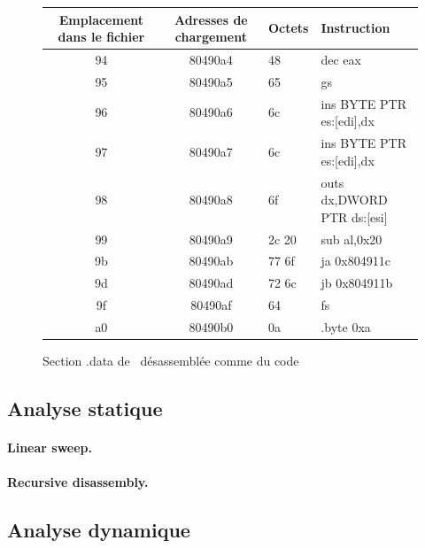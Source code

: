 \begin{figure}
\begin{center}
\begin{tabular}{|c|c|l|l|}
\hline
Emplacement dans le fichier & Adresses de chargement & Octets & Instruction\\ 
\hline
94 & 80490a4 & 48    & dec    eax			\\
95 & 80490a5 & 65    & gs				\\
96 & 80490a6 & 6c    & ins    BYTE PTR es:[edi],dx	\\
97 & 80490a7 & 6c    & ins    BYTE PTR es:[edi],dx	\\
98 & 80490a8 & 6f    & outs   dx,DWORD PTR ds:[esi]	\\
99 & 80490a9 & 2c 20 & sub    al,0x20			\\
9b & 80490ab & 77 6f & ja     0x804911c			\\
9d & 80490ad & 72 6c & jb     0x804911b			\\
9f & 80490af & 64    & fs				\\
a0 & 80490b0 & 0a    & .byte 0xa			\\
\hline
\end{tabular}
\end{center}
\caption{Section .data de \helloworld\ désassemblée comme du code}
\label{fig:data_exec_helloworld}
\end{figure}


\subsection{Analyse statique}
\paragraph{Linear sweep.}
\paragraph{Recursive disassembly.}

\subsection{Analyse dynamique}



